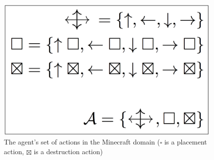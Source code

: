 \documentclass[]{article}
\begin{document}
\begin{figure}
\centering
\includegraphics[scale = 0.2]{figures/mc_action_set.png}
\caption{The agent's set of actions in the Minecraft domain ($\square$ is a placement action, $\boxtimes$ is a destruction action)}
\end{figure}
\end{document}
